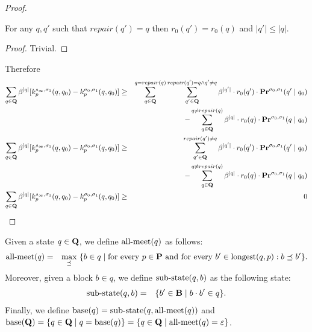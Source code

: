 \begin{proof}
	\begin{mylem}
		For any $q,q'$ such that $repair(q') = q$ then $r_0(q') = r_0(q)$ and $|q'| \leq |q|$.
	\end{mylem}
	\begin{proof}
		Trivial.
	\end{proof}
	
	Therefore
	\begin{eqnarray*}
		\sum_{q \in \mathbf{Q}} \beta^{|q|} [k^{s_{\infty},\sigma_1}_p(q,q_0)- k^{\sigma_0,\sigma_1}_p(q,q_0) ] & \geq & \sum_{q \in \mathbf{Q}}^{q = repair(q)}\sum_{q'\in \mathbf{Q}}^{repair(q') = q \land q' \neq q}  \beta^{|q'|} \cdot r_0(q') \cdot \mathbf{Pr}^{\sigma_0,\sigma_1}(q' \mid q_0)\\
		&& - \sum_{q \in \mathbf{Q}}^{q \neq repair(q)} \beta^{|q|} \cdot r_0(q)\cdot\mathbf{Pr}^{\sigma_0,\sigma_1}(q \mid q_0) \\
		\sum_{q \in \mathbf{Q}} \beta^{|q|} [k^{s_{\infty},\sigma_1}_p(q,q_0)- k^{\sigma_0,\sigma_1}_p(q,q_0) ] & \geq & \sum_{q'\in \mathbf{Q}}^{repair(q') \neq q }  \beta^{|q'|} \cdot r_0(q') \cdot \mathbf{Pr}^{\sigma_0,\sigma_1}(q' \mid q_0)\\
		&& - \sum_{q \in \mathbf{Q}}^{q \neq repair(q)} \beta^{|q|} \cdot r_0(q)\cdot\mathbf{Pr}^{\sigma_0,\sigma_1}(q \mid q_0) \\
		\sum_{q \in \mathbf{Q}} \beta^{|q|} [k^{s_{\infty},\sigma_1}_p(q,q_0)- k^{\sigma_0,\sigma_1}_p(q,q_0) ] & \geq & 0\\
	\end{eqnarray*}
	
	
\end{proof}

Given a state $q \in \mathbf{Q}$, we define $\text{\rm all-meet}(q)$ as follows:
\begin{eqnarray*}
\text{\rm all-meet}(q)  & =  & \max_{\preceq} \ \{b \in q \mid \text{for every } p\in \mathbf{P} \text{ and for every } b' \in {\text{\rm longest}}(q,p): b \preceq b'\}.
\end{eqnarray*}
Moreover, given a block $b \in q$, we define ${\text{\rm sub-state}}(q,b)$ as the following state:
\begin{eqnarray*}
{\text{\rm sub-state}}(q,b) & = & \{ b' \in \mathbf{B} \mid b \cdot b' \in q\}.
\end{eqnarray*}
Finally, 
we define $\text{\rm base}(q) = {\text{\rm sub-state}}(q,\text{\rm all-meet}(q))$ 
and $\text{\rm base}(\mathbf{Q}) = \{q \in \mathbf{Q} \mid q = \text{\rm base}(q)\} = \{q \in \mathbf{Q} \mid \text{\rm all-meet}(q) = \varepsilon \}$.

